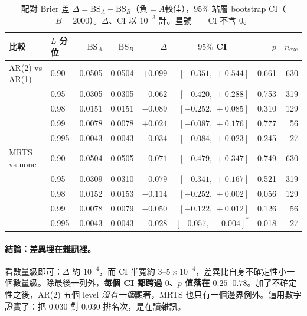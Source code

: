 \documentclass[12pt]{article}
\newcommand{\BS}{\mathrm{BS}}
\begin{document}
\begin{table}[htbp]
\centering
\caption{配對 Brier 差 $\Delta=\BS_A-\BS_B$（負$=A$較佳），$95\%$ 站層
bootstrap CI（$B{=}2000$）。$\Delta$、CI 以 $10^{-3}$ 計。星號 $=$ CI 不含 $0$。}
\label{tab:boot}
\small
\begin{tabular}{@{}llrrrrr r@{}}
\toprule
比較 & $L$ 分位 & $\BS_A$ & $\BS_B$ & $\Delta$ & \multicolumn{1}{c}{$95\%$ CI} & $p$ & $n_{\mathrm{exc}}$ \\
\midrule
AR(2) vs AR(1) & 0.90  & 0.0505 & 0.0504 & $+0.099$ & $[-0.351,\,+0.544]$ & 0.661 & 630 \\
               & 0.95  & 0.0305 & 0.0305 & $-0.062$ & $[-0.420,\,+0.288]$ & 0.753 & 319 \\
               & 0.98  & 0.0151 & 0.0151 & $-0.089$ & $[-0.252,\,+0.085]$ & 0.310 & 129 \\
               & 0.99  & 0.0078 & 0.0078 & $+0.024$ & $[-0.087,\,+0.176]$ & 0.777 & 56  \\
               & 0.995 & 0.0043 & 0.0043 & $-0.034$ & $[-0.084,\,+0.023]$ & 0.245 & 27  \\
\midrule
MRTS vs none   & 0.90  & 0.0504 & 0.0505 & $-0.071$ & $[-0.479,\,+0.347]$ & 0.749 & 630 \\
               & 0.95  & 0.0309 & 0.0310 & $-0.079$ & $[-0.341,\,+0.167]$ & 0.521 & 319 \\
               & 0.98  & 0.0152 & 0.0153 & $-0.114$ & $[-0.252,\,+0.002]$ & 0.056 & 129 \\
               & 0.99  & 0.0078 & 0.0079 & $-0.050$ & $[-0.122,\,+0.012]$ & 0.126 & 56  \\
               & 0.995 & 0.0043 & 0.0043 & $-0.028$ & $[-0.057,\,-0.004]^{*}$ & 0.018 & 27 \\
\bottomrule
\end{tabular}
\end{table}

\paragraph{結論：差異埋在雜訊裡。}看數量級即可：$\Delta$ 約 $10^{-4}$，而 CI 半寬約
$3\text{–}5\times10^{-4}$，差異比自身不確定性小一個數量級。除最後一列外，\textbf{每個
CI 都跨過 $0$、$p$ 值落在 $0.25$--$0.78$}。加了不確定性之後，AR(2) 五個 level
\emph{沒有一個}顯著，MRTS 也只有一個邊界例外。這用數字證實了：把 $0.030$ 對
$0.030$ 排名次，是在讀雜訊。
\end{document}

